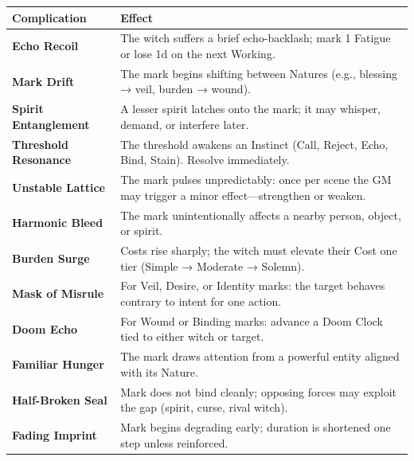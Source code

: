 \documentclass[11pt]{book}
\begin{document}
\begin{center}
\begin{longtable}{p{} p{}}
\toprule
\textbf{Complication} & \textbf{Effect} \\
\midrule

\textbf{Echo Recoil} &
The witch suffers a brief echo-backlash; mark 1 Fatigue or lose 1d on the next Working. \\

\textbf{Mark Drift} &
The mark begins shifting between Natures (e.g., blessing → veil, burden → wound). \\

\textbf{Spirit Entanglement} &
A lesser spirit latches onto the mark; it may whisper, demand, or interfere later. \\

\textbf{Threshold Resonance} &
The threshold awakens an Instinct (Call, Reject, Echo, Bind, Stain). Resolve immediately. \\

\textbf{Unstable Lattice} &
The mark pulses unpredictably:  
once per scene the GM may trigger a minor effect---strengthen or weaken. \\

\textbf{Harmonic Bleed} &
The mark unintentionally affects a nearby person, object, or spirit. \\

\textbf{Burden Surge} &
Costs rise sharply; the witch must elevate their Cost one tier (Simple → Moderate → Solemn). \\

\textbf{Mask of Misrule} &
For Veil, Desire, or Identity marks: the target behaves contrary to intent for one action. \\

\textbf{Doom Echo} &
For Wound or Binding marks: advance a Doom Clock tied to either witch or target. \\

\textbf{Familiar Hunger} &
The mark draws attention from a powerful entity aligned with its Nature. \\

\textbf{Half-Broken Seal} &
Mark does not bind cleanly; opposing forces may exploit the gap (spirit, curse, rival witch). \\

\textbf{Fading Imprint} &
Mark begins degrading early; duration is shortened one step unless reinforced. \\

\bottomrule
\end{longtable}
\end{center}
\end{document}
